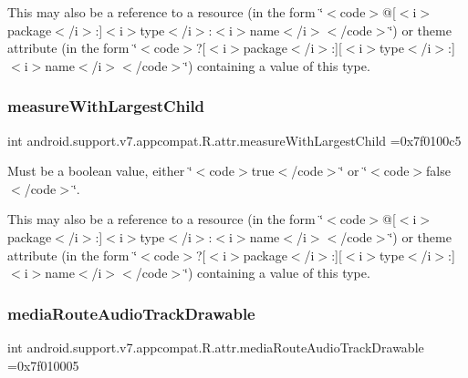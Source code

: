This may also be a reference to a resource (in the form \char`\"{}$<$code$>$@\mbox{[}$<$i$>$package$<$/i$>$\+:\mbox{]}$<$i$>$type$<$/i$>$\+:$<$i$>$name$<$/i$>$$<$/code$>$\char`\"{}) or theme attribute (in the form \char`\"{}$<$code$>$?\mbox{[}$<$i$>$package$<$/i$>$\+:\mbox{]}\mbox{[}$<$i$>$type$<$/i$>$\+:\mbox{]}$<$i$>$name$<$/i$>$$<$/code$>$\char`\"{}) containing a value of this type. \mbox{\label{classandroid_1_1support_1_1v7_1_1appcompat_1_1R_1_1attr_a57b891f80593796c5cba8f35567f332c}} 
\subsubsection{\texorpdfstring{measure\+With\+Largest\+Child}{measureWithLargestChild}}
{\footnotesize\ttfamily int android.\+support.\+v7.\+appcompat.\+R.\+attr.\+measure\+With\+Largest\+Child =0x7f0100c5\hspace{0.3cm}{\ttfamily [static]}}

Must be a boolean value, either \char`\"{}$<$code$>$true$<$/code$>$\char`\"{} or \char`\"{}$<$code$>$false$<$/code$>$\char`\"{}. 

This may also be a reference to a resource (in the form \char`\"{}$<$code$>$@\mbox{[}$<$i$>$package$<$/i$>$\+:\mbox{]}$<$i$>$type$<$/i$>$\+:$<$i$>$name$<$/i$>$$<$/code$>$\char`\"{}) or theme attribute (in the form \char`\"{}$<$code$>$?\mbox{[}$<$i$>$package$<$/i$>$\+:\mbox{]}\mbox{[}$<$i$>$type$<$/i$>$\+:\mbox{]}$<$i$>$name$<$/i$>$$<$/code$>$\char`\"{}) containing a value of this type. \mbox{\label{classandroid_1_1support_1_1v7_1_1appcompat_1_1R_1_1attr_abceb9280c7bbae775d76137f6c23c8bf}} 
\subsubsection{\texorpdfstring{media\+Route\+Audio\+Track\+Drawable}{mediaRouteAudioTrackDrawable}}
{\footnotesize\ttfamily int android.\+support.\+v7.\+appcompat.\+R.\+attr.\+media\+Route\+Audio\+Track\+Drawable =0x7f010005\hspace{0.3cm}{\ttfamily [static]}}

